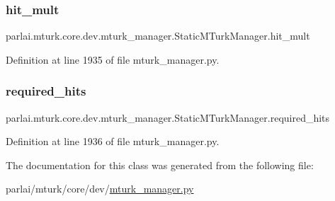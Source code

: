\subsubsection{\texorpdfstring{hit\+\_\+mult}{hit\_mult}}
{\footnotesize\ttfamily parlai.\+mturk.\+core.\+dev.\+mturk\+\_\+manager.\+Static\+M\+Turk\+Manager.\+hit\+\_\+mult}



Definition at line 1935 of file mturk\+\_\+manager.\+py.

\mbox{\label{classparlai_1_1mturk_1_1core_1_1dev_1_1mturk__manager_1_1StaticMTurkManager_a3d9217d2766c900a597e36a39f80018d}} 
\subsubsection{\texorpdfstring{required\+\_\+hits}{required\_hits}}
{\footnotesize\ttfamily parlai.\+mturk.\+core.\+dev.\+mturk\+\_\+manager.\+Static\+M\+Turk\+Manager.\+required\+\_\+hits}



Definition at line 1936 of file mturk\+\_\+manager.\+py.



The documentation for this class was generated from the following file\+:\begin{DoxyCompactItemize}
\item 
parlai/mturk/core/dev/\hyperlink{dev_2mturk__manager_8py}{mturk\+\_\+manager.\+py}\end{DoxyCompactItemize}
